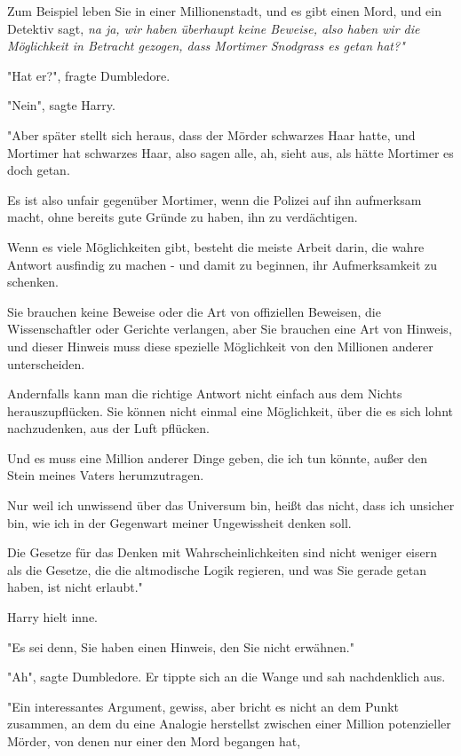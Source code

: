 {Zum Beispiel leben Sie in einer Millionenstadt, und es gibt einen Mord, und ein Detektiv sagt, \emph{na ja, wir haben überhaupt keine Beweise, also haben wir die Möglichkeit in Betracht gezogen, dass Mortimer Snodgrass es getan hat?"}

"Hat er?", fragte Dumbledore.

"Nein", sagte Harry.

"Aber später stellt sich heraus, dass der Mörder schwarzes Haar hatte, und Mortimer hat schwarzes Haar, also sagen alle, ah, sieht aus, als hätte Mortimer es doch getan.

Es ist also unfair gegenüber Mortimer, wenn die Polizei auf ihn aufmerksam macht, ohne bereits gute Gründe zu haben, ihn zu verdächtigen.

Wenn es viele Möglichkeiten gibt, besteht die meiste Arbeit darin, die wahre Antwort ausfindig zu machen - und damit zu beginnen, ihr Aufmerksamkeit zu schenken.

Sie brauchen keine Beweise oder die Art von offiziellen Beweisen, die Wissenschaftler oder Gerichte verlangen, aber Sie brauchen eine Art von Hinweis, und dieser Hinweis muss diese spezielle Möglichkeit von den Millionen anderer unterscheiden.

Andernfalls kann man die richtige Antwort nicht einfach aus dem Nichts herauszupflücken. Sie können nicht einmal eine Möglichkeit, über die es sich lohnt nachzudenken, aus der Luft pflücken.

Und es muss eine Million anderer Dinge geben, die ich tun könnte, außer den Stein meines Vaters herumzutragen.

Nur weil ich unwissend über das Universum bin, heißt das nicht, dass ich unsicher bin, wie ich in der Gegenwart meiner Ungewissheit denken soll.

Die Gesetze für das Denken mit Wahrscheinlichkeiten sind nicht weniger eisern als die Gesetze, die die altmodische Logik regieren, und was Sie gerade getan haben, ist nicht erlaubt."

Harry hielt inne.

"Es sei denn, Sie haben einen Hinweis, den Sie nicht erwähnen."

"Ah", sagte Dumbledore. Er tippte sich an die Wange und sah nachdenklich aus.

"Ein interessantes Argument, gewiss, aber bricht es nicht an dem Punkt zusammen, an dem du eine Analogie herstellst zwischen einer Million potenzieller Mörder, von denen nur einer den Mord begangen hat,

}
